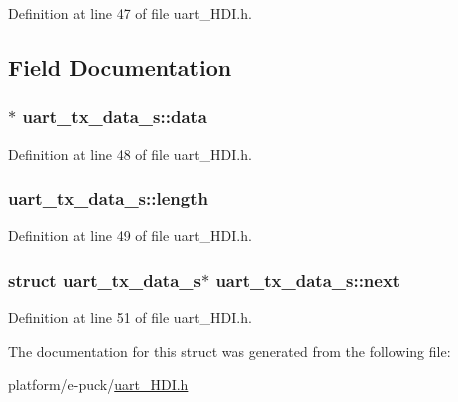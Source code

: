 Definition at line 47 of file uart\+\_\+\+H\+D\+I.\+h.



\subsection{Field Documentation}
\hypertarget{structuart__tx__data__s_a8c8a4dcb88914689fbcf3c605e7e086a}{}
\subsubsection[{data}]{$\ast$ uart\+\_\+tx\+\_\+data\+\_\+s\+::data}\label{structuart__tx__data__s_a8c8a4dcb88914689fbcf3c605e7e086a}


Definition at line 48 of file uart\+\_\+\+H\+D\+I.\+h.

\hypertarget{structuart__tx__data__s_a5f6561e844d7ba918becf2eeadfa7fdf}{}
\subsubsection[{length}]{ uart\+\_\+tx\+\_\+data\+\_\+s\+::length}\label{structuart__tx__data__s_a5f6561e844d7ba918becf2eeadfa7fdf}


Definition at line 49 of file uart\+\_\+\+H\+D\+I.\+h.

\hypertarget{structuart__tx__data__s_a1ca59d43b0ec489235518ce3037eb350}{}
\subsubsection[{next}]{\setlength{\rightskip}{0pt plus 5cm}struct {\bf uart\+\_\+tx\+\_\+data\+\_\+s}$\ast$ uart\+\_\+tx\+\_\+data\+\_\+s\+::next}\label{structuart__tx__data__s_a1ca59d43b0ec489235518ce3037eb350}


Definition at line 51 of file uart\+\_\+\+H\+D\+I.\+h.



The documentation for this struct was generated from the following file\+:\begin{DoxyCompactItemize}
\item 
platform/e-\/puck/\hyperlink{uart__HDI_8h}{uart\+\_\+\+H\+D\+I.\+h}\end{DoxyCompactItemize}
